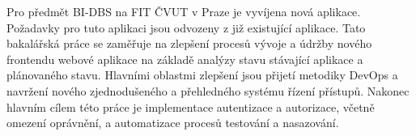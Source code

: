 Pro předmět BI-DBS na FIT ČVUT v Praze je vyvíjena nová aplikace. Požadavky pro tuto aplikaci jsou odvozeny z již existující aplikace. Tato bakalářská práce se zaměřuje na zlepšení procesů vývoje a údržby nového frontendu webové aplikace na základě analýzy stavu stávající aplikace a plánovaného stavu. Hlavními oblastmi zlepšení jsou přijetí metodiky DevOps a navržení nového zjednodušeného a přehledného systému řízení přístupů. Nakonec hlavním cílem této práce je implementace autentizace a autorizace, včetně omezení oprávnění, a automatizace procesů testování a nasazování.